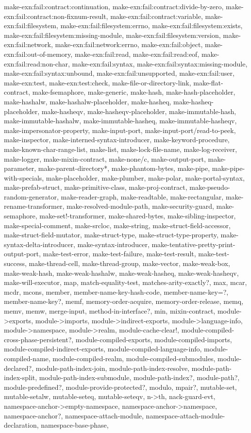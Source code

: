 {{make-exn:fail:contract:continuation, make-exn:fail:contract:divide-by-zero, make-exn:fail:contract:non-fixnum-result, make-exn:fail:contract:variable, make-exn:fail:filesystem, make-exn:fail:filesystem:errno, make-exn:fail:filesystem:exists, make-exn:fail:filesystem:missing-module, make-exn:fail:filesystem:version, make-exn:fail:network, make-exn:fail:network:errno, make-exn:fail:object, make-exn:fail:out-of-memory, make-exn:fail:read, make-exn:fail:read:eof, make-exn:fail:read:non-char, make-exn:fail:syntax, make-exn:fail:syntax:missing-module, make-exn:fail:syntax:unbound, make-exn:fail:unsupported, make-exn:fail:user, make-exn:test, make-exn:test:check, make-file-or-directory-link, make-flat-contract, make-fsemaphore, make-generic, make-hash, make-hash-placeholder, make-hashalw, make-hashalw-placeholder, make-hasheq, make-hasheq-placeholder, make-hasheqv, make-hasheqv-placeholder, make-immutable-hash, make-immutable-hashalw, make-immutable-hasheq, make-immutable-hasheqv, make-impersonator-property, make-input-port, make-input-port/read-to-peek, make-inspector, make-interned-syntax-introducer, make-keyword-procedure, make-known-char-range-list, make-list, make-lock-file-name, make-log-receiver, make-logger, make-mixin-contract, make-none/c, make-output-port, make-parameter, make-parent-directory*, make-phantom-bytes, make-pipe, make-pipe-with-specials, make-placeholder, make-plumber, make-polar, make-portal-syntax, make-prefab-struct, make-primitive-class, make-proj-contract, make-pseudo-random-generator, make-reader-graph, make-readtable, make-rectangular, make-rename-transformer, make-resolved-module-path, make-security-guard, make-semaphore, make-set!-transformer, make-shared-bytes, make-sibling-inspector, make-special-comment, make-srcloc, make-string, make-struct-field-accessor, make-struct-field-mutator, make-struct-type, make-struct-type-property, make-syntax-delta-introducer, make-syntax-introducer, make-tentative-pretty-print-output-port, make-test-error, make-test-failure, make-test-result, make-test-success, make-thread-cell, make-thread-group, make-vector, make-weak-box, make-weak-hash, make-weak-hashalw, make-weak-hasheq, make-weak-hasheqv, make-will-executor, map, match-equality-test, matches-arity-exactly?, max, mcar, mcdr, mcons, member, member-name-key-hash-code, member-name-key=?, member-name-key?, memf, memory-order-acquire, memory-order-release, memq, memv, memw, merge-input, method-in-interface?, min, mixin-contract, module->exports, module->imports, module->indirect-exports, module->language-info, module->namespace, module->realm, module-cache-clear!, module-compiled-cross-phase-persistent?, module-compiled-exports, module-compiled-imports, module-compiled-indirect-exports, module-compiled-language-info, module-compiled-name, module-compiled-realm, module-compiled-submodules, module-declared?, module-path-index-join, module-path-index-resolve, module-path-index-split, module-path-index-submodule, module-path-index?, module-path?, module-predefined?, module-provide-protected?, modulo, mpair?, mutable-set, mutable-setalw, mutable-seteq, mutable-seteqv, n->th, nack-guard-evt, namespace-anchor->empty-namespace, namespace-anchor->namespace, namespace-anchor?, namespace-attach-module, namespace-attach-module-declaration, namespace-base-phase, }}
